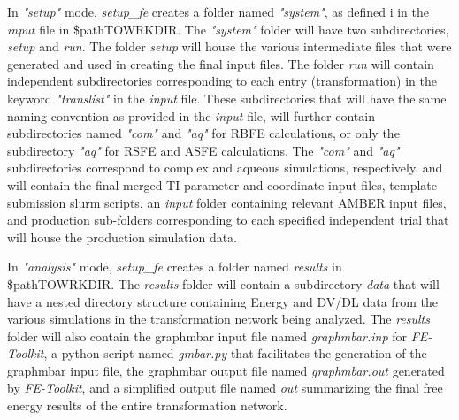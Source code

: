 \documentclass[11pt,letterpaper,titlepage]{article}
\begin{document}
In \textit{"setup"} mode, \textit{setup\_fe} creates a folder named \textit{"system"}, as defined i
in the \textit{input} file in \$pathTOWRKDIR. 
The \textit{"system"} folder will have two subdirectories, \textit{setup} and \textit{run}. The folder
\textit{setup} will house the  various intermediate files that were generated and used in creating 
the final input files. The folder \textit{run} will contain independent subdirectories corresponding 
to each entry (transformation) in the keyword \textit{"translist"} in the \textit{input} file. These 
subdirectories that will have the same naming convention as provided in the \textit{input} file, 
will further contain subdirectories named \textit{"com"} and \textit{"aq"} for RBFE calculations, or 
only the subdirectory \textit{"aq"} for RSFE and ASFE calculations. The \textit{"com"} and \textit{"aq"}
subdirectories correspond to complex and aqueous simulations, respectively, and will contain 
the final merged TI parameter and coordinate input files, template submission slurm scripts, an
\textit{input} folder containing relevant AMBER input files, and production sub-folders corresponding 
to each specified independent trial that will house the production simulation data. 

In \textit{"analysis"} mode, \textit{setup\_fe} creates a folder named \textit{results} in \$pathTOWRKDIR. 
The \textit{results} folder will contain a subdirectory \textit{data} that will have a nested directory 
structure containing Energy and DV/DL data from the various simulations in the transformation network 
being analyzed. The \textit{results} folder will also contain the graphmbar input file named
\textit{graphmbar.inp} for \textit{FE-Toolkit}, a python script named \textit{gmbar.py} that facilitates 
the generation of the graphmbar input file, the graphmbar output file named \textit{graphmbar.out} 
generated by \textit{FE-Toolkit}, and a simplified output file named \textit{out} summarizing the final 
free energy results of the entire transformation network.
\end{document}
